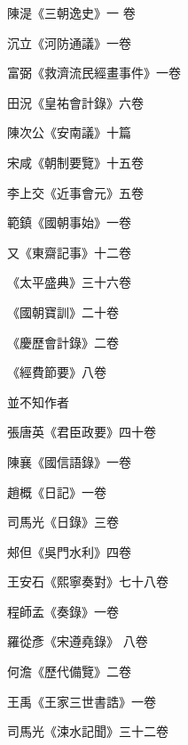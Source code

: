 \begin{pinyinscope}
 陳湜《三朝逸史》一
 卷



 沉立《河防通議》一卷



 富弼《救濟流民經畫事件》一卷



 田況《皇祐會計錄》六卷



 陳次公《安南議》十篇



 宋咸《朝制要覽》十五卷



 李上交《近事會元》五卷



 範鎮《國朝事始》一卷



 又《東齋記事》十二卷



 《太平盛典》三十六卷



 《國朝寶訓》二十卷



 《慶歷會計錄》二卷



 《經費節要》八卷



 並不知作者



 張唐英《君臣政要》四十卷



 陳襄《國信語錄》一卷



 趙概《日記》一卷



 司馬光《日錄》三卷



 郟但《吳門水利》四卷



 王安石《熙寧奏對》七十八卷



 程師孟《奏錄》一卷



 羅從彥《宋遵堯錄》
 八卷



 何澹《歷代備覽》二卷



 王禹《王家三世書誥》一卷



 司馬光《涑水記聞》三十二卷




\end{pinyinscope}
